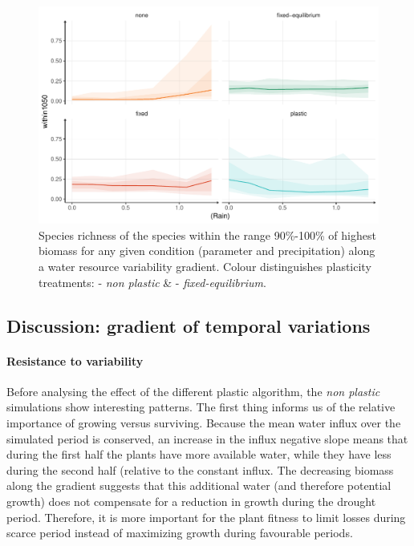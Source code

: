 \begin{figure}\label{fig:variable}
\includegraphics[width = \textwidth]{./2_PP/Figures/Variable/var_spdiv_trend.pdf}
\caption[Species richness of the best performing species along a water resource variability gradient]{Species richness of the species within the range 90\%-100\% of highest biomass for any given condition (parameter and precipitation) along a water resource variability gradient.  Colour distinguishes plasticity treatments: \textcolor{myOrange}{- \textit{non plastic}} \&  \textcolor{myGreen}{- \textit{fixed-equilibrium}}.}
\end{figure}






\subsection{Discussion: gradient of temporal variations}

\paragraph{Resistance to variability}

Before analysing the effect of the different plastic algorithm, the \textit{non plastic} simulations show interesting patterns. The first thing informs us of the relative importance of growing versus surviving. Because the mean water influx over the simulated period is conserved, an increase in the influx negative slope means that during the first half the plants have more available water, while they have less during the second half (relative to the constant influx. The decreasing biomass along the gradient suggests that this additional water (and therefore potential growth) does not compensate for a reduction in growth during the drought period. Therefore, it is more important for the plant fitness to limit losses during scarce period instead of maximizing growth during favourable periods. 

